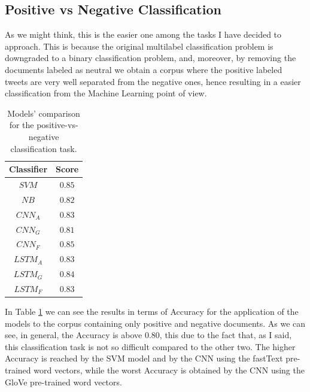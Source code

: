 \documentclass[11pt,twocolumn]{article}
\begin{document}
        \subsection{Positive vs Negative Classification} %
        \label{sub:positive_vs_negative_classification}
            As we might think, this is the easier one among the tasks I have decided to approach. This is
            because the original multilabel classification problem is downgraded to a binary classification
            problem, and, moreover, by removing the documents labeled as neutral we obtain a corpus where
            the positive labeled tweets are very well separated from the negative ones, hence resulting in
            a easier classification from the Machine Learning point of view.

                \begin{table}[h]
                     \centering
                     \begin{tabular}{| c | c |}
                        \hline
                        \textbf{Classifier} & \textbf{Score} \\
                        \hline
                        $SVM$ & $0.85$ \\
                        \hline
                        $NB$ & $0.82$ \\
                        \hline
                        $CNN_A$ & $0.83$ \\
                        \hline
                        $CNN_G$ & $0.81$ \\
                        \hline
                        $CNN_F$ & $0.85$ \\
                        \hline
                        $LSTM_A$ & $0.83$ \\
                        \hline
                        $LSTM_G$ & $0.84$ \\
                        \hline
                        $LSTM_F$ & $0.83$ \\
                        \hline
                    \end{tabular}
                    \caption{Models' comparison for the positive-vs-negative classification task.}
                    \label{tab:pn_comparison}
                \end{table}

            \noindent
            In Table \ref{tab:pn_comparison} we can see the results in terms of Accuracy for the application
            of the models to the corpus containing only positive and negative documents. As we can see, in
            general, the Accuracy is above $0.80$, this due to the fact that, as I said, this
            classification task is not so difficult compared to the other two. The higher Accuracy is
            reached by the SVM model and by the CNN using the fastText pre-trained word vectors, while the
            worst Accuracy is obtained by the CNN using the GloVe pre-trained word vectors.
\end{document}
